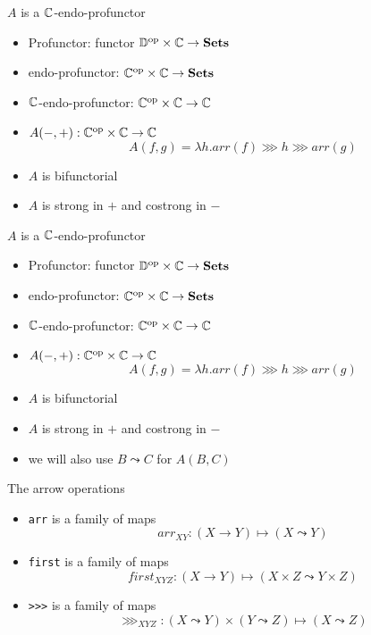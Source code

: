 \begin{frame}[fragile]
\begin{center}\Large $A$ is a $\mathbb{C}$-endo-profunctor\end{center}
    \begin{itemize}
        \item Profunctor: functor ${\mathbb{D}}^{\text{op}} \times \mathbb{C} \to \mathbf{Sets}$
        \item endo-profunctor: ${\mathbb{C}}^{\text{op}} \times \mathbb{C} \to \mathbf{Sets}$
        \item $\mathbb{C}$-endo-profunctor: ${\mathbb{C}}^{\text{op}} \times \mathbb{C} \to \mathbb{C}$
        \item $A(-, +): {\mathbb{C}}^{\text{op}} \times \mathbb{C} \to \mathbb{C}$
            \[
                    A(f, g) = \lambda h. arr(f) \ggg h \ggg arr(g)
            \]
        \item $A$ is bifunctorial
        \item $A$ is strong in $+$ and costrong in $-$
    \end{itemize}
\end{frame}

\begin{frame}[fragile]
\begin{center}\Large $A$ is a $\mathbb{C}$-endo-profunctor\end{center}
    \begin{itemize}
        \item Profunctor: functor ${\mathbb{D}}^{\text{op}} \times \mathbb{C} \to \mathbf{Sets}$
        \item endo-profunctor: ${\mathbb{C}}^{\text{op}} \times \mathbb{C} \to \mathbf{Sets}$
        \item $\mathbb{C}$-endo-profunctor: ${\mathbb{C}}^{\text{op}} \times \mathbb{C} \to \mathbb{C}$
        \item $A(-, +): {\mathbb{C}}^{\text{op}} \times \mathbb{C} \to \mathbb{C}$
            \[
                    A(f, g) = \lambda h. arr(f) \ggg h \ggg arr(g)
            \]
        \item $A$ is bifunctorial
        \item $A$ is strong in $+$ and costrong in $-$
        \item we will also use $B \leadsto C$ for $A(B, C)$
    \end{itemize}
\end{frame}

\begin{frame}[fragile]
    \begin{center}\Large The arrow operations\end{center}
    \begin{itemize}
        \item \verb|arr| is a family of maps
            \[ arr_{XY}: (X \to Y) \mapsto (X \leadsto Y) \]
        \item \verb|first| is a family of maps
            \[ first_{XYZ}: (X \to Y) \mapsto (X \times Z \leadsto Y \times Z) \]
        \item \verb|>>>| is a family of maps
            \[ \ggg_{XYZ}: (X \leadsto Y) \times (Y \leadsto Z) \mapsto (X \leadsto Z) \]
    \end{itemize}
\end{frame}

